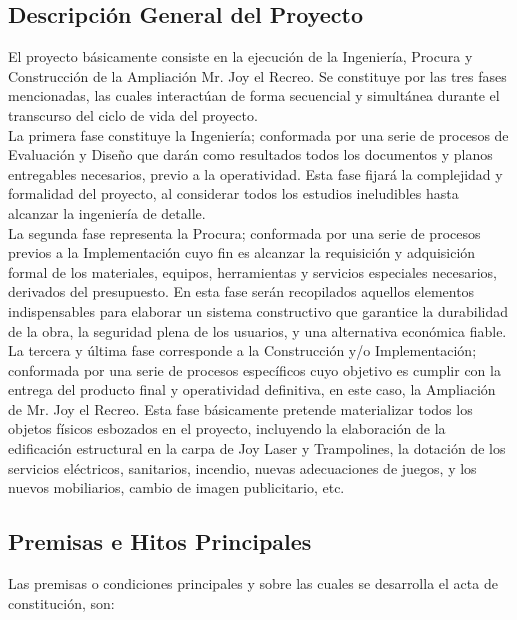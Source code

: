 \documentclass[11pt,a4paper,roman]{article}
\begin{document}
\subsection{Descripción General del Proyecto}
El proyecto básicamente consiste en la ejecución de la Ingeniería, Procura y Construcción de la Ampliación Mr. Joy el Recreo. Se constituye por las tres fases mencionadas, las cuales interactúan de forma secuencial y simultánea durante el transcurso del ciclo de vida del proyecto.\\[0.25in]
La primera fase constituye la Ingeniería; conformada por una serie de procesos de  Evaluación y Diseño que darán como resultados todos los documentos y planos entregables necesarios, previo a la operatividad. Esta fase fijará la complejidad y formalidad del proyecto, al considerar todos los estudios ineludibles hasta alcanzar la ingeniería de detalle.\\[0.25in] 
La segunda fase representa la Procura; conformada por una serie de procesos previos a la Implementación cuyo fin es alcanzar la requisición y adquisición  formal de los materiales, equipos, herramientas y servicios especiales necesarios, derivados del presupuesto. En esta fase serán recopilados aquellos elementos indispensables para elaborar un sistema constructivo que garantice la durabilidad de la obra, la seguridad plena de los usuarios, y una alternativa económica fiable.\\[0.25in]
La tercera y última fase corresponde a la Construcción y/o Implementación; conformada por una serie de procesos  específicos cuyo objetivo es cumplir con la entrega del producto final y operatividad definitiva, en este caso, la Ampliación de Mr. Joy el Recreo. Esta fase básicamente pretende materializar todos los objetos físicos esbozados en el proyecto, incluyendo la elaboración de la edificación estructural en la carpa de Joy Laser y Trampolines, la dotación de los servicios eléctricos, sanitarios, incendio, nuevas adecuaciones de juegos, y los nuevos mobiliarios, cambio de imagen publicitario, etc.\\

\subsection{Premisas e Hitos Principales}
Las premisas o condiciones principales y sobre las cuales se desarrolla el acta de constitución, son:
\end{document}

